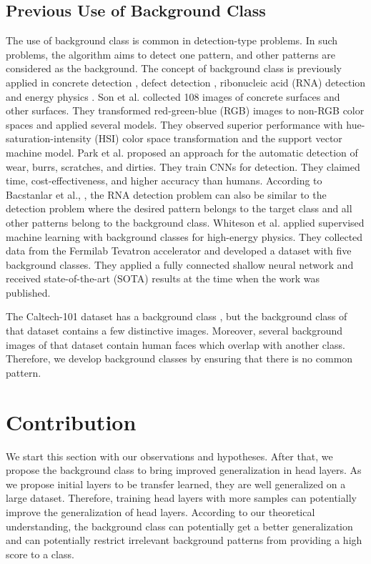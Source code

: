 \documentclass{article}
\begin{document}
\subsection{Previous Use of Background Class}
The use of background class is common in detection-type problems. In such problems, the algorithm aims to detect one pattern, and other patterns are considered as the background. The concept of background class is previously applied in concrete detection \cite{son2012automated}, defect detection \cite{park2016machine}, ribonucleic acid (RNA) detection \cite{bacstanlar2014introduction} and energy physics \cite{whiteson2009machine}. Son et al. \cite{son2012automated} collected 108 images of concrete surfaces and other surfaces. They transformed red-green-blue (RGB) images to non-RGB color spaces and applied several models. They observed superior performance with hue-saturation-intensity (HSI) color space transformation and the support vector machine model. Park et al. \cite{park2016machine} proposed an approach for the automatic detection of wear, burrs, scratches, and dirties. They train CNNs for detection. They claimed time, cost-effectiveness, and higher accuracy than humans. According to Bacstanlar et al., \cite{bacstanlar2014introduction}, the RNA detection problem can also be similar to the detection problem where the desired pattern belongs to the target class and all other patterns belong to the background class.
Whiteson et al. \cite{whiteson2009machine} applied supervised machine learning with background classes for high-energy physics. They collected data from the Fermilab Tevatron accelerator and developed a dataset with five background classes. They applied a fully connected shallow neural network and received state-of-the-art (SOTA) results at the time when the work was published. 

The Caltech-101 dataset has a background class \cite{li2004caltech}, but the background class of that dataset contains a few distinctive images. Moreover, several background images of that dataset contain human faces which overlap with another class. Therefore, we develop background classes by ensuring that there is no common pattern.


\section{Contribution}
We start this section with our observations and hypotheses. After that, we propose the background class to bring improved generalization in head layers. As we propose initial layers to be transfer learned, they are well generalized on a large dataset. Therefore, training head layers with more samples can potentially improve the generalization of head layers. According to our theoretical understanding, the background class can potentially get a better generalization and can potentially restrict irrelevant background patterns from providing a high score to a class. 
\end{document}
